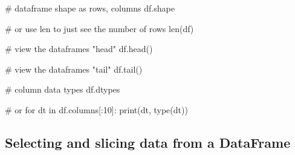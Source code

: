 \documentclass[
  letterpaper,
  DIV=11,
  numbers=noendperiod]{scrreprt}
\newenvironment{Shaded}{\begin{snugshade}}{\end{snugshade}}
\newcommand{\BuiltInTok}[1]{\textcolor[rgb]{0.00,0.23,0.31}{#1}}
\newcommand{\CommentTok}[1]{\textcolor[rgb]{0.37,0.37,0.37}{#1}}
\newcommand{\ControlFlowTok}[1]{\textcolor[rgb]{0.00,0.23,0.31}{#1}}
\newcommand{\DecValTok}[1]{\textcolor[rgb]{0.68,0.00,0.00}{#1}}
\newcommand{\KeywordTok}[1]{\textcolor[rgb]{0.00,0.23,0.31}{#1}}
\newcommand{\NormalTok}[1]{\textcolor[rgb]{0.00,0.23,0.31}{#1}}
\begin{document}
\begin{Shaded}
\begin{Highlighting}[]
\CommentTok{\# dataframe shape as rows, columns}
\NormalTok{df.shape}
\end{Highlighting}
\end{Shaded}

\begin{Shaded}
\begin{Highlighting}[]
\CommentTok{\# or use len to just see the number of rows}
\BuiltInTok{len}\NormalTok{(df)}
\end{Highlighting}
\end{Shaded}

\begin{Shaded}
\begin{Highlighting}[]
\CommentTok{\# view the dataframe\textquotesingle{}s "head"}
\NormalTok{df.head()}
\end{Highlighting}
\end{Shaded}

\begin{Shaded}
\begin{Highlighting}[]
\CommentTok{\# view the dataframe\textquotesingle{}s "tail"}
\NormalTok{df.tail()}
\end{Highlighting}
\end{Shaded}

\begin{Shaded}
\begin{Highlighting}[]
\CommentTok{\# column data types}
\NormalTok{df.dtypes}
\end{Highlighting}
\end{Shaded}

\begin{Shaded}
\begin{Highlighting}[]
\CommentTok{\# or}
\ControlFlowTok{for}\NormalTok{ dt }\KeywordTok{in}\NormalTok{ df.columns[:}\DecValTok{10}\NormalTok{]:}
    \BuiltInTok{print}\NormalTok{(dt, }\BuiltInTok{type}\NormalTok{(dt))}
\end{Highlighting}
\end{Shaded}

\subsection{Selecting and slicing data from a
DataFrame}\label{selecting-and-slicing-data-from-a-dataframe}
\end{document}
